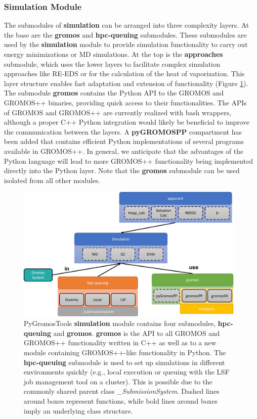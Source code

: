 \subsubsection{Simulation Module}
The submodules of \textbf{simulation} can be arranged into three complexity layers. At the base are the \textbf{gromos} and \textbf{hpc-queuing} submodules. These submodules are used by the \textbf{simulation} module to provide simulation functionality to carry out energy minimizations or MD simulations. At the top is the \textbf{approaches} submodule, which uses the lower layers to facilitate complex simulation approaches like RE-EDS or for the calculation of the heat of vaporization. This layer structure enables fast adaptation and extension of functionality (Figure \ref{fig: SimulationModule}).
%
The submodule \textbf{gromos} contains the Python API to the GROMOS\cite{Schmid2012} and GROMOS++\cite{Eichenberger2011} binaries, providing quick access to their functionalities. The APIs of GROMOS and GROMOS++ are currently realized with bash wrappers, although a proper C++ Python integration would likely be beneficial to improve the communication between the layers. A \textbf{pyGROMOSPP} compartment has been added that contains efficient Python implementations of several programs available in GROMOS++. In general, we anticipate that the advantages of the Python language will lead to more GROMOS++ functionality being implemented directly into the Python layer. Note that the \textbf{gromos} submodule can be used isolated from all other modules.

\begin{figure}[h]
    \centering
    \includegraphics[width=\textwidth]{fig/implementation/Simulation.png}
    \caption{PyGromosTools \textbf{simulation} module contains four submodules, \textbf{hpc-queuing} and \textbf{gromos}. \textbf{gromos} is the API to all GROMOS and GROMOS++ functionality written in C++ as well as to a new module containing GROMOS++-like functionality in Python. The \textbf{hpc-queuing} submodule is used to set up simulations in different environments quickly (e.g., local execution or queuing with the LSF job management tool on a cluster). This is possible due to the commonly shared parent class \textit{\_SubmissionSystem}. Dashed lines around boxes represent functions, while bold lines around boxes imply an underlying class structure.}
    \label{fig: SimulationModule}
\end{figure}

